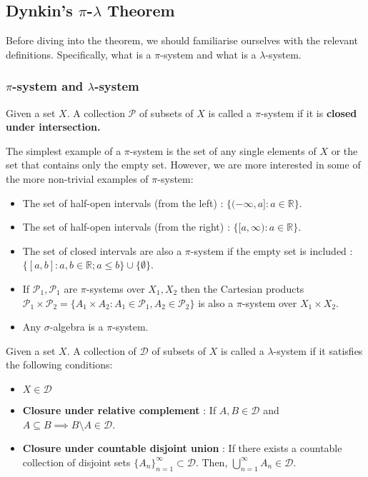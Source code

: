 \newpage
\subsection{Dynkin's $\pi$-$\lambda$ Theorem}
\noindent Before diving into the theorem, we should familiarise ourselves with the relevant definitions. Specifically, what is a $\pi$-system and what is a $\lambda$-system.

\subsubsection{$\pi$-system and $\lambda$-system}
\begin{definition}[$\pi$-system]
    Given a set $X$. A collection $\mathcal{P}$ of subsets of $X$ is called a $\pi$-system if it is \bf{closed under intersection}.
\end{definition}

\noindent The simplest example of a $\pi$-system is the set of any single elements of $X$ or the set that contains only the empty set. However, we are more interested in some of the more non-trivial examples of $\pi$-system:

\begin{itemize}
    \item The set of half-open intervals (from the left) : $\{(-\infty, a] : a \in \mathbb{R} \}$.
    \item The set of half-open intervals (from the right) : $\{ [a, \infty) : a \in \mathbb{R} \}$.
    \item The set of closed intervals are also a $\pi$-system if the empty set is included : $\{[a, b] : a, b \in \mathbb{R}; a\le b \} \cup \{ \emptyset \}$.
    \item If $\mathcal{P}_1, \mathcal{P}_1$ are $\pi$-systems over $X_1, X_2$ then the Cartesian products $\mathcal{P}_1\times \mathcal{P}_2 = \{ A_1 \times A_2 : A_1 \in \mathcal{P}_1, A_2 \in \mathcal{P}_2 \}$ is also a $\pi$-system over $X_1 \times X_2$.
    \item Any $\sigma$-algebra is a $\pi$-system.
\end{itemize}

\begin{definition}
    Given a set $X$. A collection of $\mathcal{D}$ of subsets of $X$ is called a $\lambda$-system if it satisfies the following conditions:
    \begin{itemize}
        \item $X \in \mathcal{D}$
        \item \textbf{Closure under relative complement} : If $A, B \in\mathcal{D}$ and $A \subseteq B \implies B \setminus A \in \mathcal{D}$.
        \item \textbf{Closure under countable disjoint union} : If there exists a countable collection of disjoint sets $\{A_n\}_{n=1}^\infty \subset \mathcal{D}$. Then, $\bigcup_{n=1}^\infty A_n \in \mathcal{D}$.
    \end{itemize}
\end{definition}

